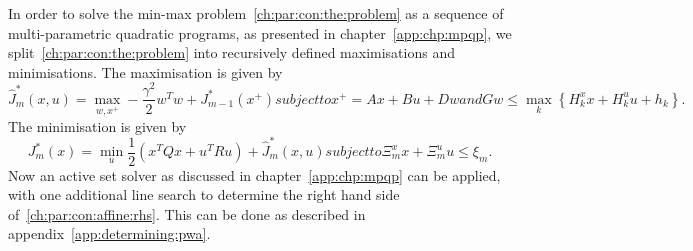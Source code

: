 %
\par
%
In order to solve the min-max problem~\eqref{ch:par:con:the:problem} as a sequence of
multi-parametric quadratic programs, as presented in chapter~\ref{app:chp:mpqp}, we 
split~\eqref{ch:par:con:the:problem} into recursively defined maximisations and minimisations.
%
The maximisation is given by
%
\begin{subequations}\label{ch:par:con:the:maximisation}
	\begin{equation}
		\hat J_m^\ast(x,u) =\max_{w,x^+} -\frac{\gamma^2}{2} w^Tw + J_{m-1}^\ast(x^+)
	\end{equation}
	subject to
	\begin{equation}
		x^+ = Ax + Bu + Dw
	\end{equation}
	and
	\begin{equation}\label{ch:par:con:affine:rhs}
		Gw \leq \max_k\left\{H^x_k x + H^u_k u + h_k\right\}.
	\end{equation}
\end{subequations}
%
The minimisation is given by
%
\begin{subequations}\label{ch:par:con:the:minimisation}
	\begin{equation}
		J_m^\ast(x) = \min_u \frac{1}{2}\left( x^T Q x + u^T R u \right) + \hat J_m^\ast(x,u)
	\end{equation}
	subject to
	\begin{equation}
		\Xi_m^x x + \Xi_m^u u \leq \xi_m.
	\end{equation}
\end{subequations}
%
Now an active set solver as discussed in chapter~\ref{app:chp:mpqp} can be applied, with one additional
line search to determine the right hand side of~\eqref{ch:par:con:affine:rhs}.
%
This can be done as described in appendix~\ref{app:determining:pwa}.